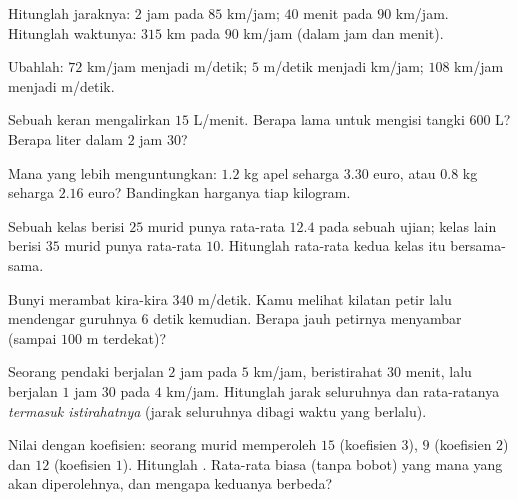 \begin{exercise}[$\star$]\label{exo:g8:speed:2}
Hitunglah jaraknya: $2$ jam pada $85$ km/jam; $40$ menit pada
$90$ km/jam. Hitunglah waktunya: $315$ km pada $90$ km/jam (dalam jam
dan menit).
\end{exercise}

\begin{exercise}[$\star$]\label{exo:g8:speed:3}
Ubahlah: $72$ km/jam menjadi m/detik; $5$ m/detik menjadi km/jam;
$108$ km/jam menjadi m/detik.
\end{exercise}

\begin{exercise}[$\star$]\label{exo:g8:speed:4}
Sebuah keran mengalirkan $15$ L/menit. Berapa lama untuk mengisi
tangki $600$ L? Berapa liter dalam $2$ jam $30$?
\end{exercise}

\begin{exercise}[$\star$]\label{exo:g8:speed:5}
Mana yang lebih menguntungkan: $1.2$ kg apel seharga $3.30$ euro, atau
$0.8$ kg seharga $2.16$ euro? Bandingkan harganya tiap kilogram.
\end{exercise}

\begin{exercise}[$\star$]\label{exo:g8:speed:6}
Sebuah kelas berisi $25$ murid punya rata-rata $12.4$ pada sebuah
ujian; kelas lain berisi $35$ murid punya rata-rata $10$. Hitunglah
rata-rata kedua kelas itu bersama-sama.
\end{exercise}

\begin{exercise}[$\star$]\label{exo:g8:speed:7}
Bunyi merambat kira-kira $340$ m/detik. Kamu melihat kilatan petir
lalu mendengar guruhnya $6$ detik kemudian. Berapa jauh petirnya
menyambar (sampai $100$ m terdekat)?
\end{exercise}

\begin{exercise}[$\star\star$]\label{exo:g8:speed:8}
Seorang pendaki berjalan $2$ jam pada $5$ km/jam, beristirahat
$30$ menit, lalu berjalan $1$ jam $30$
pada $4$ km/jam. Hitunglah jarak seluruhnya dan  rata-ratanya
\emph{termasuk istirahatnya} (jarak seluruhnya dibagi waktu yang berlalu).
\end{exercise}

\begin{exercise}[$\star\star$]\label{exo:g8:speed:9}
Nilai dengan koefisien: seorang murid memperoleh $15$ (koefisien $3$),
$9$ (koefisien $2$) dan $12$ (koefisien $1$). Hitunglah . Rata-rata biasa (tanpa bobot) yang mana yang akan
diperolehnya, dan mengapa keduanya berbeda?
\end{exercise}

